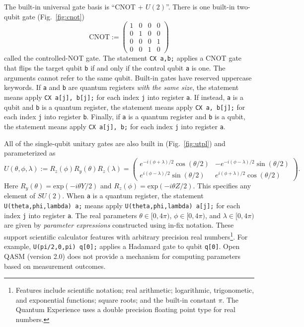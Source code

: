 \documentclass[USenglish,12pt,fleqn]{article} %
\newcommand*{\code}{\texttt}
\begin{document}
The built-in universal gate basis is ``CNOT + $U(2)$''. There is one built-in two-qubit gate (Fig.~\ref{fig:cnot})
\begin{equation}
\mathrm{CNOT} := \left(\begin{array}{cccc}
1 & 0 & 0 & 0 \\
0 & 1 & 0 & 0 \\
0 & 0 & 0 & 1 \\
0 & 0 & 1 & 0 \end{array}\right)
\end{equation}
called the controlled-NOT gate. The statement \code{CX a,b;} applies a CNOT gate that flips the target qubit \code{b} if and only if the control qubit \code{a} is one. The arguments cannot refer to the same qubit. Built-in gates have reserved uppercase keywords. If \code{a} and \code{b} are quantum registers {\em with the same size}, the statement means apply \code{CX a[j], b[j];} for each index \code{j} into register \code{a}. If instead, \code{a} is a qubit and \code{b} is a quantum register, the statement means apply \code{CX a, b[j];} for each index \code{j} into register \code{b}. Finally, if \code{a} is a quantum register and \code{b} is a qubit, the statement means apply \code{CX a[j], b;} for each index \code{j} into register \code{a}.

All of the single-qubit unitary gates are also built in (Fig.~\ref{fig:utpl}) and parameterized as
\begin{equation}
U(\theta,\phi,\lambda) := R_z(\phi)R_y(\theta)R_z(\lambda) = \left(\begin{array}{cc} e^{-i(\phi+\lambda)/2}\cos(\theta/2) & -e^{-i(\phi-\lambda)/2}\sin(\theta/2) \\
e^{i(\phi-\lambda)/2}\sin(\theta/2) & e^{i(\phi+\lambda)/2}\cos(\theta/2) \end{array}\right).
\end{equation}
Here $R_y(\theta)=\mathrm{exp}(-i\theta Y/2)$ and $R_z(\phi)=\mathrm{exp}(-i\theta Z/2)$. This specifies any element of $SU(2)$. When \code{a} is a quantum register, the statement \code{U(theta,phi,lambda) a;} means apply \code{U(theta,phi,lambda) a[j];} for each index \code{j} into register \code{a}. The real parameters $\theta\in [0,4\pi)$, $\phi\in [0,4\pi)$, and $\lambda\in [0,4\pi)$ are given by {\it parameter expressions} constructed using in-fix notation. These support scientific calculator features with arbitrary precision real numbers\footnote{Features include scientific notation; real arithmetic; logarithmic, trigonometic, and exponential functions; square roots; and the built-in constant $\pi$. The Quantum Experience uses a double precision floating point type for real numbers.}. For example, \code{U(pi/2,0,pi) q[0];} applies a Hadamard gate to qubit \code{q[0]}. Open QASM (version 2.0) does not provide a mechanism for computing parameters based on measurement outcomes.
\end{document}

